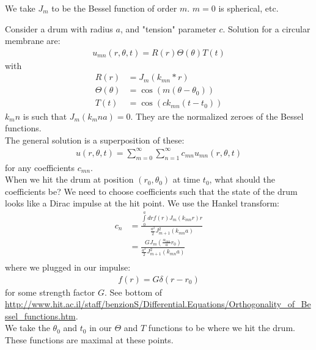 \documentclass[12pt]{article}
\begin{document}
\maketitle

We take $J_m$ to be the Bessel function of order $m$.  $m=0$ is spherical, etc.

Consider a drum with radius $a$, and "tension" parameter $c$.  Solution for a circular membrane are:
\begin{align*}
    u_{mn}(r, \theta, t) = R(r) \Theta(\theta) T(t)
\end{align*}
with
\begin{align*}
    R(r) &= J_m( k_{mn} * r) \\
    \Theta(\theta) &= \cos (m(\theta - \theta_0)) \\
    T(t) &= \cos (c k_{mn} (t - t_0))
\end{align*}
$k_mn$ is such that $J_m(k_mn a) = 0$.  They are the normalized zeroes of the Bessel functions. \\
The general solution is a superposition of these:
\begin{align*}
    u(r, \theta, t) = \sum_{m = 0}^\infty \sum_{n=1}^\infty c_{mn} u_{mn}(r, \theta, t)
\end{align*}
for any coefficients $c_{mn}$.  \\
When we hit the drum at position $(r_0, \theta_0)$ at time $t_0$, what should the coefficients be?  We need to choose coefficients such that the state of the drum looks like a Dirac impulse at the hit point.  We use the Hankel transform:
\begin{align*}
    c_n &= \frac{\int\limits_0^a dr f(r) J_m(k_{mn} r) r}{\frac{a^2}{2} J^2_{m+1}(k_{mn} a)} \\
        &= \frac{G J_m(\frac{\alpha_{mn}}{a} r_0)}{\frac{a^2}{2} J^2_{m+1}(k_{mn} a)} \\
\end{align*}
where we plugged in our impulse:
\begin{align*}
    f(r) = G \delta(r - r_0)
\end{align*}
for some strength factor $G$.  See bottom of \url{http://www.hit.ac.il/staff/benzionS/Differential.Equations/Orthogonality_of_Bessel_functions.htm}. \\

We take the $\theta_0$ and $t_0$ in our $\Theta$ and $T$ functions to be where we hit the drum.  These functions are maximal at these points.
\end{document}
